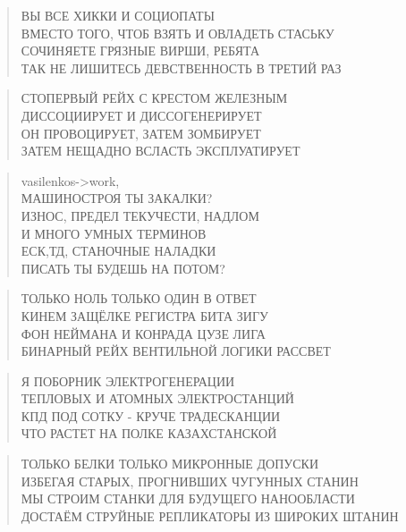\poemtitle{***}
\begin{verse}
ВЫ ВСЕ ХИККИ И СОЦИОПАТЫ\\
ВМЕСТО ТОГО, ЧТОБ ВЗЯТЬ И ОВЛАДЕТЬ СТАСЬКУ\\
СОЧИНЯЕТЕ ГРЯЗНЫЕ ВИРШИ, РЕБЯТА\\
ТАК НЕ ЛИШИТЕСЬ ДЕВСТВЕННОСТЬ В ТРЕТИЙ РАЗ
\end{verse}

\poemtitle{***}
\begin{verse}
СТОПЕРВЫЙ РЕЙХ С КРЕСТОМ ЖЕЛЕЗНЫМ\\
ДИССОЦИИРУЕТ И ДИССОГЕНЕРИРУЕТ\\
ОН ПРОВОЦИРУЕТ, ЗАТЕМ ЗОМБИРУЕТ\\
ЗАТЕМ НЕЩАДНО ВСЛАСТЬ ЭКСПЛУАТИРУЕТ
\end{verse}

\poemtitle{***}
\begin{verse}
vasilenkos->work, \\
МАШИНОСТРОЯ ТЫ ЗАКАЛКИ?\\
ИЗНОС, ПРЕДЕЛ ТЕКУЧЕСТИ, НАДЛОМ\\
И МНОГО УМНЫХ ТЕРМИНОВ\\
ЕС{К,Т}Д, СТАНОЧНЫЕ НАЛАДКИ\\
ПИСАТЬ ТЫ БУДЕШЬ НА ПОТОМ?
\end{verse}

\poemtitle{***}
\begin{verse}
ТОЛЬКО НОЛЬ ТОЛЬКО ОДИН В ОТВЕТ\\
КИНЕМ ЗАЩЁЛКЕ РЕГИСТРА БИТА ЗИГУ\\
ФОН НЕЙМАНА И КОНРАДА ЦУЗЕ ЛИГА\\
БИНАРНЫЙ РЕЙХ ВЕНТИЛЬНОЙ ЛОГИКИ РАССВЕТ
\end{verse}

\poemtitle{***}
\begin{verse}
Я ПОБОРНИК ЭЛЕКТРОГЕНЕРАЦИИ\\
ТЕПЛОВЫХ И АТОМНЫХ ЭЛЕКТРОСТАНЦИЙ\\
КПД ПОД СОТКУ - КРУЧЕ ТРАДЕСКАНЦИИ\\
ЧТО РАСТЕТ НА ПОЛКЕ КАЗАХСТАНСКОЙ
\end{verse}

\poemtitle{***}
\begin{verse}
ТОЛЬКО БЕЛКИ ТОЛЬКО МИКРОННЫЕ ДОПУСКИ\\
ИЗБЕГАЯ СТАРЫХ, ПРОГНИВШИХ ЧУГУННЫХ СТАНИН\\
МЫ СТРОИМ СТАНКИ ДЛЯ БУДУЩЕГО НАНООБЛАСТИ\\
ДОСТАЁМ СТРУЙНЫЕ РЕПЛИКАТОРЫ ИЗ ШИРОКИХ ШТАНИН
\end{verse}

